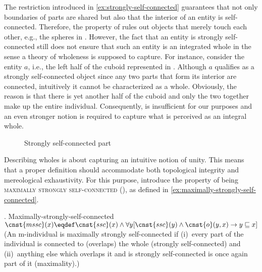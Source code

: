 	The restriction introduced in \ref{ex:strongly-self-connected} guarantees that not only boundaries of parts are shared but also that the interior of an entity is self-connected. Therefore, the property of  rules out objects that merely touch each other, e.g., the spheres in . However, the fact that an entity is strongly self-connected still does not ensure that such an entity is an integrated whole in the sense a theory of wholeness is supposed to capture. For instance, consider the entity $a$, i.e., the left half of the cuboid represented in . Although $a$ qualifies as a strongly self-connected object since any two parts that form its interior are connected, intuitively it cannot be characterized as a whole. Obviously, the reason is that there is yet another half of the cuboid and only the two together make up the entire individual. Consequently,  is insufficient for our purposes and an even stronger notion is required to capture what is perceived as an integral whole.

\begin{figure}[h!]
\centering
{}
\caption{Strongly self-connected part}
\label{fig:strongly-self-connected-part}
\end{figure}

	Describing wholes is about capturing an intuitive notion of unity. This means that a proper definition should accommodate both topological integrity and mereological exhaustivity. For this purpose, \citet{casati_varzi1999parts} introduce the property of being \textsc{maximally strongly self-connected} (), as defined in \ref{ex:maximally-strongly-self-connected}.
	
	\ex. Maximally-strongly-self-connected \citep[p. 60; adapted]{casati_varzi1999parts}\label{ex:maximally-strongly-self-connected}\\
	$\cnst{mssc}(x) \eqdef \cnst{ssc}(x) \wedge \forall y[\cnst{ssc}(y) \wedge \cnst{o}(y,x) \rightarrow y \sqsubseteq x]$\\
    (An m-individual is maximally strongly self-connected if (i)~every part of the individual is connected to (overlaps) the whole (strongly self-connect\-ed) and (ii)~anything else which overlaps it and is strongly self-connected is once again part of it (maximality).)

